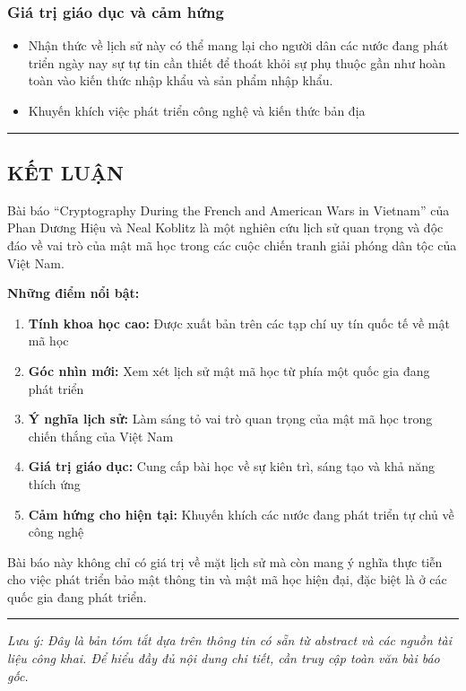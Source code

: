 \subsubsection{Giá trị giáo dục và cảm hứng}
\begin{itemize}
\item Nhận thức về lịch sử này có thể mang lại cho người dân các nước đang phát triển ngày nay sự tự tin cần thiết để thoát khỏi sự phụ thuộc gần như hoàn toàn vào kiến thức nhập khẩu và sản phẩm nhập khẩu.
\item Khuyến khích việc phát triển công nghệ và kiến thức bản địa
\end{itemize}

\vspace{0.5cm}
\rule{\textwidth}{1pt}
\vspace{0.5cm}

\subsection{KẾT LUẬN}

Bài báo ``Cryptography During the French and American Wars in Vietnam'' của Phan Dương Hiệu và Neal Koblitz là một nghiên cứu lịch sử quan trọng và độc đáo về vai trò của mật mã học trong các cuộc chiến tranh giải phóng dân tộc của Việt Nam.

\textbf{Những điểm nổi bật:}

\begin{enumerate}
\item \textbf{Tính khoa học cao:} Được xuất bản trên các tạp chí uy tín quốc tế về mật mã học
\item \textbf{Góc nhìn mới:} Xem xét lịch sử mật mã học từ phía một quốc gia đang phát triển
\item \textbf{Ý nghĩa lịch sử:} Làm sáng tỏ vai trò quan trọng của mật mã học trong chiến thắng của Việt Nam
\item \textbf{Giá trị giáo dục:} Cung cấp bài học về sự kiên trì, sáng tạo và khả năng thích ứng
\item \textbf{Cảm hứng cho hiện tại:} Khuyến khích các nước đang phát triển tự chủ về công nghệ
\end{enumerate}

Bài báo này không chỉ có giá trị về mặt lịch sử mà còn mang ý nghĩa thực tiễn cho việc phát triển bảo mật thông tin và mật mã học hiện đại, đặc biệt là ở các quốc gia đang phát triển.

\vspace{1cm}
\rule{\textwidth}{1pt}
\vspace{0.5cm}

\begin{center}
\textit{Lưu ý: Đây là bản tóm tắt dựa trên thông tin có sẵn từ abstract và các nguồn tài liệu công khai. Để hiểu đầy đủ nội dung chi tiết, cần truy cập toàn văn bài báo gốc.}
\end{center}
